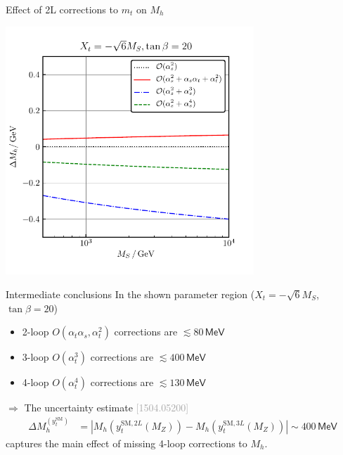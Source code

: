 \documentclass[hyperref={pdfpagelabels=false},ngerman]{beamer}
\newcommand{\eh}[1]{\,\mathsf{#1}}
\newcommand{\MeV}{\eh{MeV}}
\newcommand{\bigcite}[1]{\textcolor{darkgray}{[#1]}}
\newcommand{\SM}{\ensuremath{\text{SM}}}
\newcommand{\at}{\alpha_t}
\newcommand{\as}{\alpha_s}
\newcommand{\DMhHSSUSYytSM}{\ensuremath{\Delta M_h^{(y_t^\SM)}}}
\begin{document}
\begin{frame}{Effect of 2L corrections to $m_t$ on $M_h$}
  \begin{center}
    \includegraphics[width=0.7\textwidth]{plots/kuts-10/DMh_MS_mt3L4LQCD}
  \end{center} 
\end{frame}

\begin{frame}{Intermediate conclusions}
  In the shown parameter region ($X_t = -\sqrt{6}M_S$, $\tan\beta = 20$)
  \begin{itemize}
  \item 2-loop $O(\at\as, \at^2)$ corrections are $\lesssim 80\MeV$
  \item 3-loop $O(\at^3)$ corrections are $\lesssim 400\MeV$
  \item 4-loop $O(\at^4)$ corrections are $\lesssim 130\MeV$
  \end{itemize}
  \vspace*{0.5em}
  $\Rightarrow$ The uncertainty estimate \bigcite{1504.05200}
  \begin{align*}
    \DMhHSSUSYytSM &= \left| M_h(y_t^{\SM,2L}(M_Z)) - M_h(y_t^{\SM,3L}(M_Z)) \right| \sim 400\MeV
  \end{align*}
  captures the main effect of missing 4-loop corrections to $M_h$.
\end{frame}
\end{document}
